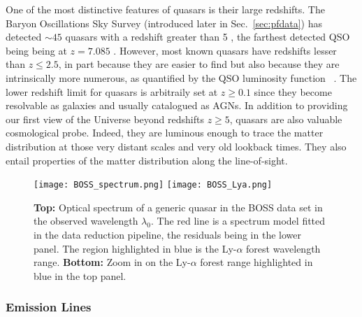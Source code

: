 One of the most distinctive features of quasars is their large redshifts. The Baryon Oscillations Sky Survey (introduced later in Sec.~\ref{sec:pfdata}) has detected $\sim 45$ quasars with a redshift greater than 5 \citep{Paris2013}, the farthest detected QSO being being at $z=7.085$
\citep{Mortlock2011}. However, most known quasars have redshifts lesser than $z \leq 2.5$, in part because they are easier to find but also because they are intrinsically more numerous, as quantified by the QSO luminosity function ~\citep{Palanque-Delabrouille2013a}. The lower redshift limit for quasars is arbitraily set at $z \geq 0.1$ since they become resolvable as galaxies and usually catalogued as AGNs. In addition to providing our first view of the Universe beyond redshifts $z \geq 5$, quasars are also valuable cosmological probe. Indeed, they are luminous enough to trace the matter distribution at those very distant scales and very old lookback times. They also entail properties of the matter distribution along the line-of-sight.

\begin{figure}
\begin{center}
\texttt{[image: BOSS\_spectrum.png]}
\texttt{[image: BOSS\_Lya.png]}
\caption{\textbf{Top:} Optical spectrum of a generic quasar in the BOSS data set in the observed wavelength $\lambda_0$. The red line is a spectrum model fitted in the data reduction pipeline, the residuals being in the lower panel. The region highlighted in blue is the Ly-$\alpha$ forest wavelength range. \textbf{Bottom:} Zoom in on the Ly-$\alpha$ forest range highlighted in blue in the top panel.}
\label{fig:boss_spectrum}
\end{center}
\end{figure}

\subsubsection{Emission Lines}

